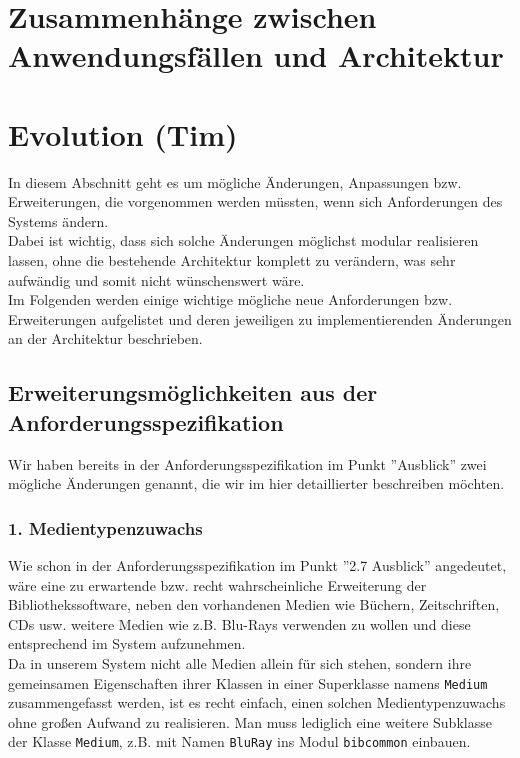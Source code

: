 \documentclass[fontsize=12pt,paper=a4,twoside]{scrartcl}
\begin{document}
\section{Zusammenhänge zwischen Anwendungsfällen und Architektur}
\label{sec:anwendungsfaelle}



\section{Evolution (Tim)}


\label{sec:evolution}

In diesem Abschnitt geht es um mögliche Änderungen, Anpassungen bzw. Erweiterungen, die vorgenommen werden müssten, wenn sich Anforderungen des Systems ändern. \\
Dabei ist wichtig, dass sich solche Änderungen möglichst modular realisieren lassen, ohne die bestehende Architektur komplett zu verändern, was sehr aufwändig und somit nicht wünschenswert wäre. \\
Im Folgenden werden einige wichtige mögliche neue Anforderungen bzw. Erweiterungen aufgelistet und deren jeweiligen zu implementierenden Änderungen an der Architektur beschrieben. 

\subsection*{Erweiterungsmöglichkeiten aus der Anforderungsspezifikation}

Wir haben bereits in der Anforderungsspezifikation im Punkt ''Ausblick'' zwei mögliche Änderungen genannt, die wir im hier detaillierter beschreiben möchten. 

\subsubsection*{1. Medientypenzuwachs}

Wie schon in der Anforderungsspezifikation im Punkt ''2.7 Ausblick'' angedeutet, wäre eine zu erwartende bzw. recht wahrscheinliche Erweiterung der Bibliothekssoftware, neben den vorhandenen Medien wie Büchern, Zeitschriften, CDs usw. weitere Medien wie z.B. Blu-Rays verwenden zu wollen und diese entsprechend im System aufzunehmen.\\
Da in unserem System nicht alle Medien allein für sich stehen, sondern ihre gemeinsamen Eigenschaften ihrer Klassen in einer Superklasse namens \texttt{Medium} zusammengefasst werden, ist es recht einfach, einen solchen Medientypenzuwachs ohne großen Aufwand zu realisieren. Man muss lediglich eine weitere Subklasse der Klasse \texttt{Medium}, z.B. mit Namen \texttt{BluRay} ins Modul \texttt{bibcommon} einbauen.
\end{document}
